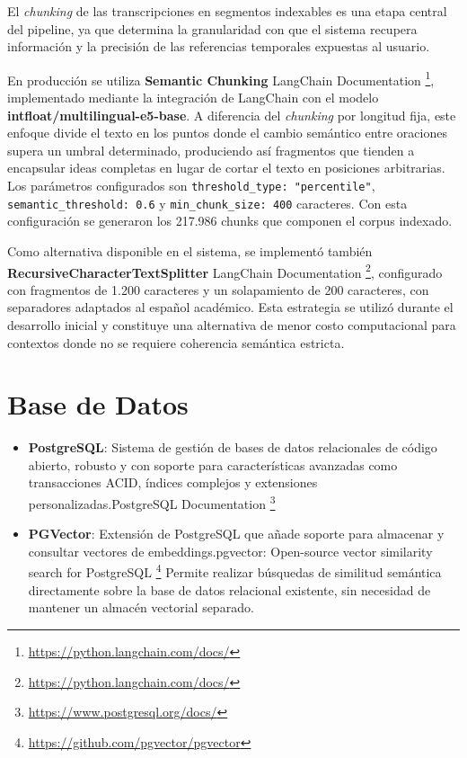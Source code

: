 El \textit{chunking} de las transcripciones en segmentos indexables es una etapa central del pipeline, ya que determina la granularidad con que el sistema recupera información y la precisión de las referencias temporales expuestas al usuario.

En producción se utiliza \textbf{Semantic Chunking} LangChain Documentation \footnote{\url{https://python.langchain.com/docs/}}, implementado mediante la integración de LangChain con el modelo \textbf{intfloat/multilingual-e5-base}. A diferencia del \textit{chunking} por longitud fija, este enfoque divide el texto en los puntos donde el cambio semántico entre oraciones supera un umbral determinado, produciendo así fragmentos que tienden a encapsular ideas completas en lugar de cortar el texto en posiciones arbitrarias. Los parámetros configurados son \texttt{threshold\_type: "percentile"}, \texttt{semantic\_threshold: 0.6} y \texttt{min\_chunk\_size: 400} caracteres. Con esta configuración se generaron los 217.986 chunks que componen el corpus indexado.

Como alternativa disponible en el sistema, se implementó también \textbf{RecursiveCharacterTextSplitter} LangChain Documentation \footnote{\url{https://python.langchain.com/docs/}}, configurado con fragmentos de 1.200 caracteres y un solapamiento de 200 caracteres, con separadores adaptados al español académico. Esta estrategia se utilizó durante el desarrollo inicial y constituye una alternativa de menor costo computacional para contextos donde no se requiere coherencia semántica estricta.

\section{Base de Datos}
\label{section:5-Base de Datos}
\begin{itemize}
    \item \textbf{PostgreSQL}: Sistema de gestión de bases de datos relacionales de código abierto, robusto y con soporte para características avanzadas como transacciones ACID, índices complejos y extensiones personalizadas.PostgreSQL Documentation \footnote{\url{https://www.postgresql.org/docs/}}

    \item \textbf{PGVector}: Extensión de PostgreSQL que añade soporte para almacenar y consultar vectores de embeddings.pgvector: Open-source vector similarity search for {PostgreSQL} \footnote{\url{https://github.com/pgvector/pgvector}} Permite realizar búsquedas de similitud semántica directamente sobre la base de datos relacional existente, sin necesidad de mantener un almacén vectorial separado.
\end{itemize}

